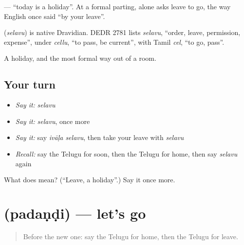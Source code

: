 \textbf{ } — \textquotedblleft{}today is a holiday\textquotedblright{}. At a formal parting, \textbf{} alone asks leave to go, the way English once said \textquotedblleft{}by your leave\textquotedblright{}.

\begin{cousinweb}
\textbf{} (\emph{selavu}) is native Dravidian. DEDR 2781 lists \emph{selavu}, \textquotedblleft{}order, leave, permission, expense\textquotedblright{}, under \emph{cellu}, \textquotedblleft{}to pass, be current\textquotedblright{}, with Tamil \emph{cel}, \textquotedblleft{}to go, pass\textquotedblright{}.
\end{cousinweb}

\begin{grammarlens}[title={What you've built}]
A holiday, and the most formal way out of a room.
\end{grammarlens}

\subsection*{Your turn}
\begin{itemize}
\raggedright
  \item \emph{Say it:} \emph{selavu}
  \item \emph{Say it:} \emph{selavu}, once more
  \item \emph{Say it:} say \emph{ivāḷa selavu}, then take your leave with \emph{selavu}
  \item \emph{Recall:} say the Telugu for soon, then the Telugu for home, then say \emph{selavu} again
\end{itemize}

\begin{tcolorbox}[breakable,colback=teal!4,colframe=teal!35!black,title={Before you move on}]
What does  mean? (\textquotedblleft{}Leave, a holiday\textquotedblright{}.) Say it once more.
\end{tcolorbox}
\section[\texorpdfstring{\te{పదండి} (padaṇḍi)}{పదండి (padaṇḍi)}]{ (padaṇḍi) — let's go}

\label{lesson:TE-C90-letsgo}



\begin{quote}
Before the new one: say the Telugu for home, then the Telugu for leave.
\end{quote}

